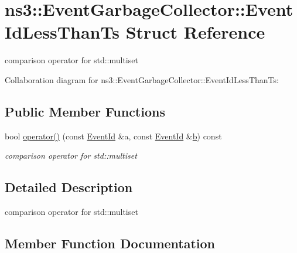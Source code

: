 \hypertarget{structns3_1_1EventGarbageCollector_1_1EventIdLessThanTs}{}\section{ns3\+:\+:Event\+Garbage\+Collector\+:\+:Event\+Id\+Less\+Than\+Ts Struct Reference}
\label{structns3_1_1EventGarbageCollector_1_1EventIdLessThanTs}


comparison operator for std\+::multiset  




Collaboration diagram for ns3\+:\+:Event\+Garbage\+Collector\+:\+:Event\+Id\+Less\+Than\+Ts\+:
\subsection*{Public Member Functions}
\begin{DoxyCompactItemize}
\item 
bool \hyperlink{structns3_1_1EventGarbageCollector_1_1EventIdLessThanTs_a096f045d4a5db9452b2436537269b957}{operator()} (const \hyperlink{classns3_1_1EventId}{Event\+Id} \&a, const \hyperlink{classns3_1_1EventId}{Event\+Id} \&\hyperlink{lte__pathloss_8m_a21ad0bd836b90d08f4cf640b4c298e7c}{b}) const 
\begin{DoxyCompactList}\small\item\em comparison operator for std\+::multiset \end{DoxyCompactList}\end{DoxyCompactItemize}


\subsection{Detailed Description}
comparison operator for std\+::multiset 

\subsection{Member Function Documentation}
